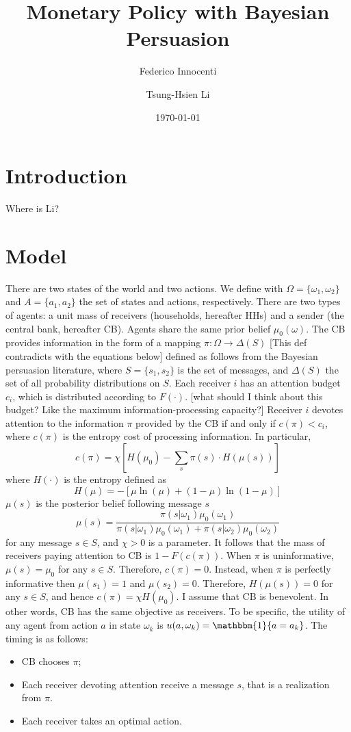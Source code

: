 \documentclass{article}
\title{Monetary Policy with Bayesian Persuasion}
\author{Federico Innocenti \and Tsung-Hsien Li}
\date{\today}
\begin{document}
\maketitle

\section{Introduction}
Where is Li?

\section{Model}
There are two states of the world and two actions. We define with $\Omega=\{\omega_1,\omega_2\}$ and $A=\{a_1,a_2\}$ the set of states and actions, respectively. There are two types of agents: a unit mass of receivers (households, hereafter HHs) and a sender (the central bank, hereafter CB). Agents share the same prior belief $\mu_0(\omega)$. The CB provides information in the form of a mapping $\pi \colon \Omega \to \Delta(S)$ [This def contradicts with the equations below] defined as follows from the Bayesian persuasion literature, where $S=\{s_1,s_2\}$ is the set of messages, and $\Delta(S)$ the set of all probability distributions on $S$.
Each receiver $i$ has an attention budget $c_i$, which is distributed according to $F(\cdot)$. [what should I think about this budget? Like the maximum information-processing capacity?] Receiver $i$ devotes attention to the information $\pi$ provided by the CB if and only if $c(\pi)<c_i$, where $c(\pi)$ is the entropy cost of processing information. In particular,
$$c(\pi)=\chi\left[H(\mu_0)-\sum_{s}\pi(s) \cdot H(\mu(s))\right]$$
where $H(\cdot)$ is the entropy defined as
$$H(\mu)=-[\mu\ln(\mu)+(1-\mu)\ln(1-\mu)]$$
$\mu(s)$ is the posterior belief following message $s$
$$\mu(s)=\frac{\pi(s|\omega_1)\mu_0(\omega_1)}{\pi(s|\omega_1)\mu_0(\omega_1)+\pi(s|\omega_2)\mu_0(\omega_2)}$$
for any message $s\in S$, and $\chi>0$ is a parameter. It follows that the mass of receivers paying attention to CB is $1-F(c(\pi))$. When $\pi$ is uninformative, $\mu(s)=\mu_0$ for any $s\in S$. Therefore, $c(\pi)=0$. Instead, when $\pi$ is perfectly informative then $\mu(s_1)=1$ and $\mu(s_2)=0$. Therefore, $H(\mu(s))=0$ for any $s\in S$, and hence $c(\pi)=\chi H(\mu_0)$. I assume that CB is benevolent. In other words, CB has the same objective as receivers. To be specific, the utility of any agent from action $a$ in state $\omega_k$ is $u(a,\omega_k)=\mathbbm{1}\{a=a_{k}\}$. The timing is as follows:
\begin{itemize}
    \item CB chooses $\pi$;
    \item Each receiver devoting attention receive a message $s$, that is a realization from $\pi$.
    \item Each receiver takes an optimal action.
\end{itemize}
\end{document}
